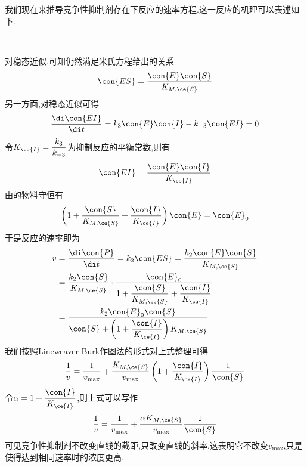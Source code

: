 \documentclass{ctexart}
\begin{document}
我们现在来推导竞争性抑制剂存在下反应的速率方程.这一反应的机理可以表述如下.
\begin{tightcenter}
    \\
\end{tightcenter}
\begin{derivation}
    对稳态近似,可知仍然满足米氏方程给出的关系
    \[\con{ES}=\dfrac{\con{E}\con{S}}{K_{M,\ce{S}}}\]
    另一方面,对稳态近似可得
    \[\dfrac{\di\con{EI}}{\di t}=k_3\con{E}\con{I}-k_{-3}\con{EI}=0\]
    令$K_{\ce{I}}=\dfrac{k_3}{k_{-3}}$为抑制反应的平衡常数,则有
    \[\con{EI}=\dfrac{\con{E}\con{I}}{K_{\ce{I}}}\]
    由的物料守恒有
    \[\left(1+\dfrac{\con{S}}{K_{M,\ce{S}}}+\dfrac{\con{I}}{K_{\ce{I}}}\right)\con{E}=\con{E}_0\]
    于是反应的速率即为
    \[\begin{aligned}
        v
        &= \dfrac{\di\con{P}}{\di t}=k_2\con{ES}=\dfrac{k_2\con{E}\con{S}}{K_{M,\ce{S}}} \\
        &= \dfrac{k_2\con{S}}{K_{M,\ce{S}}}\cdot\dfrac{\con{E}_0}{1+\dfrac{\con{S}}{K_{M,\ce{S}}}+\dfrac{\con{I}}{K_{\ce{I}}}} \\
        &= \dfrac{k_2\con{E}_0\con{S}}{\con{S}+\left(1+\dfrac{\con{I}}{K_{\ce{I}}}\right)K_{M,\ce{S}}}
    \end{aligned}\]
    我们按照Lineweaver-Burk作图法的形式对上式整理可得
    \[\dfrac{1}{v}=\dfrac{1}{v_{\max}}+\dfrac{K_{M,\ce{S}}}{v_{\max}}\left(1+\dfrac{\con{I}}{K_{\ce{I}}}\right)\dfrac{1}{\con{S}}\]
    令$\alpha=1+\dfrac{\con{I}}{K_{\ce{I}}}$,则上式可以写作
    \[\dfrac{1}{v}=\dfrac{1}{v_{\max}}+\dfrac{\alpha K_{M,\ce{S}}}{v_{\max}}\dfrac{1}{\con{S}}\]
    可见竞争性抑制剂不改变直线的截距,只改变直线的斜率.这表明它不改变$v_{\max}$,只是使得达到相同速率时的浓度更高.
\end{derivation}
\end{document}
